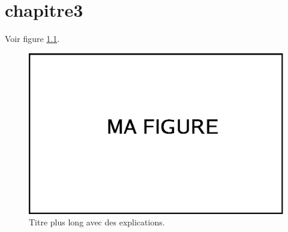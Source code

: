 \chapter{chapitre3}
Voir figure \ref{fig:mafigure3}.


\begin{figure}[htbp]
   \begin{center}
      \includegraphics[width=0.8\linewidth]{chapitre3/fig/mafigure.eps}
   \end{center}
   \caption[ titre court]
   {\footnotesize Titre plus long avec des explications.}
   \label{fig:mafigure3}
\end{figure}
